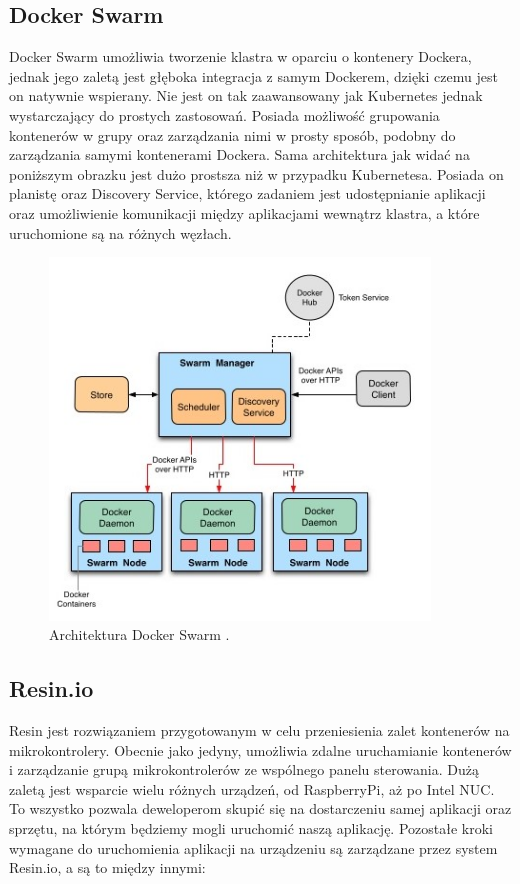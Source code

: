 \documentclass[12pt]{report}
\let\Oldsubsection\subsection
\renewcommand{\subsection}{\FloatBarrier\Oldsubsection}
\begin{document}
{\subsection{Docker Swarm}

Docker Swarm umożliwia tworzenie klastra w oparciu o kontenery Dockera, jednak jego zaletą jest głęboka integracja z samym Dockerem, dzięki czemu jest on natywnie wspierany. Nie jest on tak zaawansowany jak Kubernetes jednak wystarczający do prostych zastosowań. Posiada możliwość grupowania kontenerów w grupy oraz zarządzania nimi w prosty sposób, podobny do zarządzania samymi kontenerami Dockera. Sama architektura jak widać na poniższym obrazku jest dużo prostsza niż w przypadku Kubernetesa. Posiada on planistę oraz Discovery Service, którego zadaniem jest udostępnianie aplikacji oraz umożliwienie komunikacji między aplikacjami wewnątrz klastra, a które uruchomione są na różnych węzłach.

\begin{figure}[h]
	\centering
	\includegraphics[width=0.9\textwidth]{images/dockerSwarmArch.jpg}
	\caption{Architektura Docker Swarm \cite{dockerSwarmArchImg}.}
\end{figure}

\subsection{Resin.io} \label{subsect:resin}

Resin jest rozwiązaniem przygotowanym w celu przeniesienia zalet kontenerów na mikrokontrolery. Obecnie jako jedyny, umożliwia zdalne uruchamianie kontenerów i zarządzanie grupą mikrokontrolerów ze wspólnego panelu sterowania. Dużą zaletą jest wsparcie wielu różnych urządzeń, od RaspberryPi, aż po Intel NUC. To wszystko pozwala deweloperom skupić się na dostarczeniu samej aplikacji oraz sprzętu, na którym będziemy mogli uruchomić naszą aplikację. Pozostałe kroki wymagane do uruchomienia aplikacji na urządzeniu są zarządzane przez system Resin.io, a są to między innymi:

}
\end{document}
